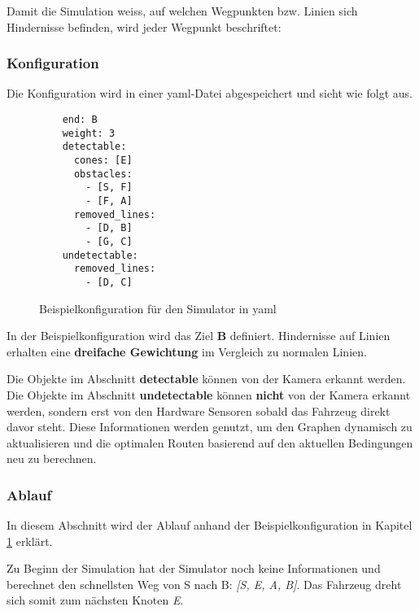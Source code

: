 \documentclass[../main.tex]{subfiles}
\begin{document}
Damit die Simulation weiss, auf welchen Wegpunkten bzw. Linien sich Hindernisse befinden, wird jeder Wegpunkt beschriftet:


\subsubsection{Konfiguration} \label{sim:Konfiguration}

Die Konfiguration wird in einer \acrshort{yaml}-Datei abgespeichert und sieht wie folgt aus.
\begin{figure}[H]
    \centering
    \begin{verbatim}
    end: B
    weight: 3
    detectable:
      cones: [E]
      obstacles: 
        - [S, F]
        - [F, A]
      removed_lines:
        - [D, B]
        - [G, C]
    undetectable:
      removed_lines:
        - [D, C]
    \end{verbatim}
    \label{fig:Beispielkonfiguration}
    \caption{Beispielkonfiguration für den Simulator in yaml}
\end{figure}

In der Beispielkonfiguration wird das Ziel \textbf{B} definiert. Hindernisse auf Linien erhalten eine \textbf{dreifache Gewichtung} im Vergleich zu normalen Linien.

Die Objekte im Abschnitt \textbf{detectable} können von der Kamera erkannt werden.
Die Objekte im Abschnitt \textbf{undetectable} können \textbf{nicht} von der Kamera erkannt werden, sondern erst von den Hardware Sensoren sobald das Fahrzeug direkt davor steht.
Diese Informationen werden genutzt, um den Graphen dynamisch zu aktualisieren und die optimalen Routen basierend auf den aktuellen Bedingungen neu zu berechnen.

\subsubsection{Ablauf}

In diesem Abschnitt wird der Ablauf anhand der Beispielkonfiguration in Kapitel \ref{fig:Beispielkonfiguration} erklärt.

Zu Beginn der Simulation hat der Simulator noch keine Informationen und berechnet den schnellsten Weg von S nach B: \textit{[S, E, A, B]}. Das Fahrzeug dreht sich somit zum nächsten Knoten \textit{E}.

\end{document}
